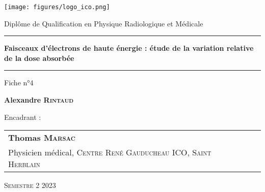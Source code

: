 \begin{titlepage}

    \unitlength 1cm
    \begin{center}
    
    \vspace*{1cm}

    \texttt{[image: figures/logo\_ico.png]}
    
    \vspace{2cm}
    
               {\Large Diplôme de Qualification en Physique Radiologique et Médicale\\}
               
    \vspace{2cm}           
    
    
    \rule{16cm}{0.7pt}
    
    \vspace{12pt}
               
               {\LARGE \bf Faisceaux d'électrons de haute énergie : étude de la variation relative de la dose absorbée\\}
               
    \vspace{12pt}
    \rule{16cm}{0.7pt}

    \vspace{2cm}

                {\large Fiche n°4}
    
    \vspace{1.5cm}

               {\Large\bf {Alexandre \textsc{Rintaud}}}
    
    \vspace{1.5cm}
    
    \end{center}
    
    Encadrant :
    
    \small {
    \begin{tabular}{llr}\\
    \textbf{Thomas \textsc{Marsac}}   &  &  \\
      Physicien médical, \textsc{Centre René Gauducheau ICO, Saint Herblain} &    &  \\
    
    \end{tabular}
    }

    \vspace{1.5cm}


    \begin{center}
    \textsc{Semestre 2 2023}
    \end{center}
    
\end{titlepage}
\let\cleardoublepage\clearpage
